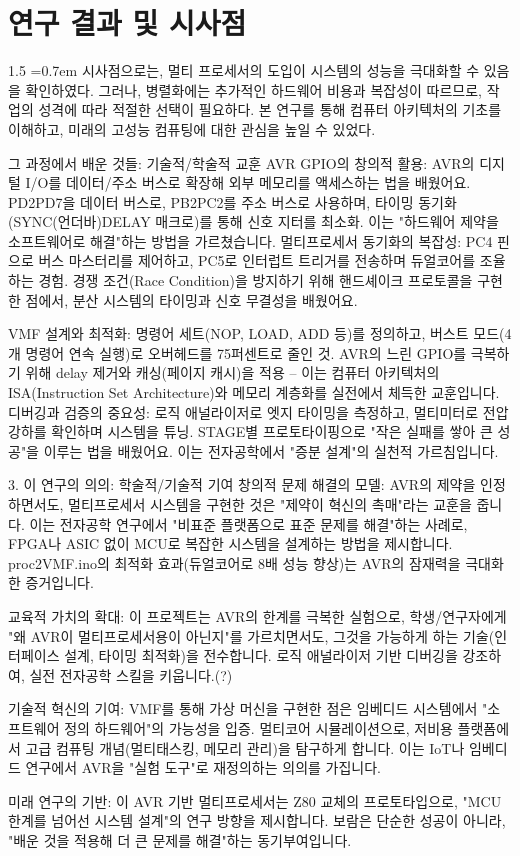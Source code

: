 \documentclass[a4paper, 12pt]{article}
\begin{document}
\section{연구 결과 및 시사점}
\begin{spacing}{1.5}
\font=0.7em
시사점으로는, 멀티 프로세서의 도입이 시스템의 성능을 극대화할 수 있음을 확인하였다. 그러나, 병렬화에는 추가적인 하드웨어 비용과 복잡성이 따르므로, 작업의 성격에 따라 적절한 선택이 필요하다. 본 연구를 통해 컴퓨터 아키텍처의 기초를 이해하고, 미래의 고성능 컴퓨팅에 대한 관심을 높일 수 있었다.

그 과정에서 배운 것들: 기술적/학술적 교훈
AVR GPIO의 창의적 활용: AVR의 디지털 I/O를 데이터/주소 버스로 확장해 외부 메모리를 액세스하는 법을 배웠어요. PD2PD7을 데이터 버스로, PB2PC2를 주소 버스로 사용하며, 타이밍 동기화(SYNC(언더바)DELAY 매크로)를 통해 신호 지터를 최소화. 이는 "하드웨어 제약을 소프트웨어로 해결"하는 방법을 가르쳤습니다.
멀티프로세서 동기화의 복잡성: PC4 핀으로 버스 마스터리를 제어하고, PC5로 인터럽트 트리거를 전송하며 듀얼코어를 조율하는 경험. 경쟁 조건(Race Condition)을 방지하기 위해 핸드셰이크 프로토콜을 구현한 점에서, 분산 시스템의 타이밍과 신호 무결성을 배웠어요.

VMF 설계와 최적화: 명령어 세트(NOP, LOAD, ADD 등)를 정의하고, 버스트 모드(4개 명령어 연속 실행)로 오버헤드를 75퍼센트로 줄인 것. AVR의 느린 GPIO를 극복하기 위해 delay 제거와 캐싱(페이지 캐시)을 적용 – 이는 컴퓨터 아키텍처의 ISA(Instruction Set Architecture)와 메모리 계층화를 실전에서 체득한 교훈입니다.
디버깅과 검증의 중요성: 로직 애널라이저로 엣지 타이밍을 측정하고, 멀티미터로 전압 강하를 확인하며 시스템을 튜닝. STAGE별 프로토타이핑으로 "작은 실패를 쌓아 큰 성공"을 이루는 법을 배웠어요. 이는 전자공학에서 "증분 설계"의 실천적 가르침입니다.

3. 이 연구의 의의: 학술적/기술적 기여
창의적 문제 해결의 모델: AVR의 제약을 인정하면서도, 멀티프로세서 시스템을 구현한 것은 "제약이 혁신의 촉매"라는 교훈을 줍니다. 이는 전자공학 연구에서 "비표준 플랫폼으로 표준 문제를 해결"하는 사례로, FPGA나 ASIC 없이 MCU로 복잡한 시스템을 설계하는 방법을 제시합니다. proc2VMF.ino의 최적화 효과(듀얼코어로 8배 성능 향상)는 AVR의 잠재력을 극대화한 증거입니다.

교육적 가치의 확대: 이 프로젝트는 AVR의 한계를 극복한 실험으로, 학생/연구자에게 "왜 AVR이 멀티프로세서용이 아닌지"를 가르치면서도, 그것을 가능하게 하는 기술(인터페이스 설계, 타이밍 최적화)을 전수합니다. 로직 애널라이저 기반 디버깅을 강조하여, 실전 전자공학 스킬을 키웁니다.(?)

기술적 혁신의 기여: VMF를 통해 가상 머신을 구현한 점은 임베디드 시스템에서 "소프트웨어 정의 하드웨어"의 가능성을 입증. 멀티코어 시뮬레이션으로, 저비용 플랫폼에서 고급 컴퓨팅 개념(멀티태스킹, 메모리 관리)을 탐구하게 합니다. 이는 IoT나 임베디드 연구에서 AVR을 "실험 도구"로 재정의하는 의의를 가집니다.

미래 연구의 기반: 이 AVR 기반 멀티프로세서는 Z80 교체의 프로토타입으로, "MCU 한계를 넘어선 시스템 설계"의 연구 방향을 제시합니다. 보람은 단순한 성공이 아니라, "배운 것을 적용해 더 큰 문제를 해결"하는 동기부여입니다.

\end{spacing}
\end{document}

